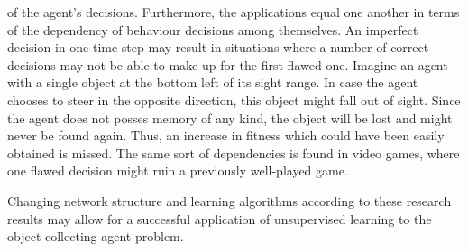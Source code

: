 \documentclass[10pt,a4paper,DIV=11]{scrreprt}
\begin{document}
of the agent's decisions. Furthermore, the applications equal one another in terms of the dependency of behaviour decisions among themselves. 
An imperfect decision in one time step may result in situations where a number of correct decisions may not be able to make up for the first flawed 
one. Imagine an agent with a single object at the bottom left of its sight range. In case the agent chooses to steer in the opposite direction,
this object might fall out of sight. Since the agent does not posses memory of any kind, the object will be lost and might never be found again.
Thus, an increase in fitness which could have been easily obtained is missed. The same sort of dependencies is found in video games, where one
flawed decision might ruin a previously well-played game.

Changing network structure and learning algorithms according to these research results may allow for a successful 
application of unsupervised learning to the object collecting agent problem. 


\newpage


\listoffigures
\listoftables
\listofalgorithms
\lstlistoflistings




\end{document}
